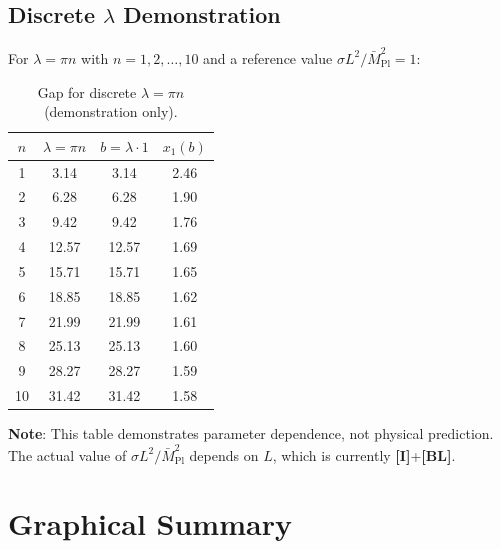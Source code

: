 \documentclass[11pt,a4paper]{article}
\newcommand{\Mpl}{\bar{M}_{\mathrm{Pl}}}
\newcommand{\tagI}{\textbf{[I]}}
\newcommand{\tagBL}{\textbf{[BL]}}
\theoremstyle{definition}
\theoremstyle{plain}
\theoremstyle{remark}
\begin{document}
\subsection{Discrete $\lambda$ Demonstration}

For $\lambda = \pi n$ with $n = 1, 2, \ldots, 10$ and a reference value
$\sigma L^2/\Mpl^2 = 1$:

\begin{table}[htbp]
\centering
\caption{Gap for discrete $\lambda = \pi n$ (demonstration only).}
\label{tab:discrete-lambda}
\begin{tabular}{@{}cccc@{}}
\toprule
$n$ & $\lambda = \pi n$ & $b = \lambda \cdot 1$ & $x_1(b)$ \\
\midrule
1 & 3.14 & 3.14 & 2.46 \\
2 & 6.28 & 6.28 & 1.90 \\
3 & 9.42 & 9.42 & 1.76 \\
4 & 12.57 & 12.57 & 1.69 \\
5 & 15.71 & 15.71 & 1.65 \\
6 & 18.85 & 18.85 & 1.62 \\
7 & 21.99 & 21.99 & 1.61 \\
8 & 25.13 & 25.13 & 1.60 \\
9 & 28.27 & 28.27 & 1.59 \\
10 & 31.42 & 31.42 & 1.58 \\
\bottomrule
\end{tabular}
\end{table}

\textbf{Note}: This table demonstrates parameter dependence, not physical prediction.
The actual value of $\sigma L^2/\Mpl^2$ depends on $L$, which is currently \tagI{}+\tagBL{}.

\section{Graphical Summary}
\label{sec:figure}
\end{document}

